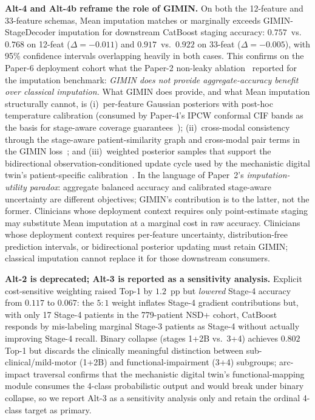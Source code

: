 \textbf{Alt-4 and Alt-4b reframe the role of GIMIN.} On both the 12-feature and 33-feature schemas, Mean imputation matches or marginally exceeds GIMIN-StageDecoder imputation for downstream CatBoost staging accuracy: $0.757$~vs.\ $0.768$ on 12-feat ($\Delta = -0.011$) and $0.917$~vs.\ $0.922$ on 33-feat ($\Delta = -0.005$), with 95\% confidence intervals overlapping heavily in both cases. This confirms on the Paper-6 deployment cohort what the Paper-2 non-leaky ablation~\cite{dupre2026paper2} reported for the imputation benchmark: \emph{GIMIN does not provide aggregate-accuracy benefit over classical imputation.} What GIMIN does provide, and what Mean imputation structurally cannot, is (i)~per-feature Gaussian posteriors with post-hoc temperature calibration (consumed by Paper-4's IPCW conformal CIF bands as the basis for stage-aware coverage guarantees~\cite{dupre2026paper4}); (ii)~cross-modal consistency through the stage-aware patient-similarity graph and cross-modal pair terms in the GIMIN loss~\cite{dupre2026paper2}; and (iii)~weighted posterior samples that support the bidirectional observation-conditioned update cycle used by the mechanistic digital twin's patient-specific calibration~\cite{dupre2026paper10}. In the language of Paper~2's \textit{imputation-utility paradox}: aggregate balanced accuracy and calibrated stage-aware uncertainty are different objectives; GIMIN's contribution is to the latter, not the former. Clinicians whose deployment context requires only point-estimate staging may substitute Mean imputation at a marginal cost in raw accuracy. Clinicians whose deployment context requires per-feature uncertainty, distribution-free prediction intervals, or bidirectional posterior updating must retain GIMIN; classical imputation cannot replace it for those downstream consumers.

\textbf{Alt-2 is deprecated; Alt-3 is reported as a sensitivity analysis.} Explicit cost-sensitive weighting raised Top-1 by $1.2$~pp but \emph{lowered} Stage-4 accuracy from $0.117$ to $0.067$: the $5{:}1$ weight inflates Stage-4 gradient contributions but, with only 17 Stage-4 patients in the 779-patient NSD+ cohort, CatBoost responds by mis-labeling marginal Stage-3 patients as Stage-4 without actually improving Stage-4 recall. Binary collapse (stages 1+2B vs.\ 3+4) achieves $0.802$ Top-1 but discards the clinically meaningful distinction between sub-clinical/mild-motor (1+2B) and functional-impairment (3+4) subgroups; arc-impact traversal confirms that the mechanistic digital twin's functional-mapping module consumes the 4-class probabilistic output and would break under binary collapse, so we report Alt-3 as a sensitivity analysis only and retain the ordinal 4-class target as primary.

